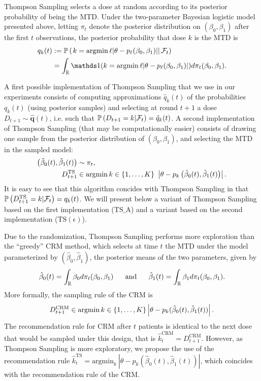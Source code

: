Thompson Sampling selects a dose at random according to its posterior probability of being the MTD. Under the two-parameter Bayesian logistic model presented above, letting $\pi_t$ denote the posterior distribution on $(\beta_0,\beta_1)$ after the first $t$ observations, the posterior probability that dose $k$ is the MTD is
\begin{align*}
{q}_k(t) &: = \bP\left(\left. k = \argmin{\ell} |\theta - p_\ell(\beta_0,\beta_1)| \right| \cF_t\right)
\\
&= \int_{\R} \ind{\left(k = \argmin{\ell} |\theta - p_\ell(\beta_0,\beta_1)|\right)} d\pi_t(\beta_0,\beta_1).
\end{align*}

A first possible implementation of Thompson Sampling that we use in our experiments consists of computing approximations $\hat{q}_k(t)$ of the probabilities ${q}_k(t)$ (using posterior samples) and selecting at round $t+1$ a dose $D_{t+1} \sim \hat{\bm q}(t)$, i.e. such that $\mathbb{P}\left(D_{t+1} = k | \mathcal{F}_t\right) = \hat{q}_k(t)$.
A second implementation of Thompson Sampling (that may be computationally easier) consists of drawing one sample from the posterior distribution of $(\beta_0,\beta_1)$, and selecting the MTD in the sampled model:  
\begin{align}
         \left(\tilde \beta_0(t), \tilde \beta_1(t)\right) & \sim \pi_t, \nonumber\\
          D_{t+1}^{\text{TS}} & \in \argmin{k \in \{1,\dots,K\}} \ \left|\theta - p_k\left(\tilde \beta_0(t),\tilde \beta_1(t)\right)\right|.\label{eq:SampleTS}
\end{align}
It is easy to see that this algorithm concides with Thompson Sampling in that $\mathbb{P}\left(D_{t+1}^{\text{TS}} = k | \mathcal{F}_t\right) = {q}_k(t)$. We will present below a variant of Thompson Sampling based on the first implementation (${\mathrm{TS}\_\mathrm{A}}$) and a variant based on the second implementation (${\mathrm{TS}(\epsilon)}$).

Due to the randomization, Thompson Sampling performs more exploration than the ``greedy'' CRM \citep{OQuigley90CRM} method, which selects at time $t$ the MTD under the model parameterized by $(\hat\beta_0,\hat\beta_1)$, the posterior means of the two parameters, given by
\begin{equation}\label{eq:CRMPostMean}
\hat{\beta}_0(t) = \int_\R \beta_0 d\pi_{t}(\beta_0,\beta_1) \ \ \ \ \ \text{and} \ \ \ \ \ \hat{\beta}_1(t) = \int_\R \beta_1 d\pi_{t}(\beta_0,\beta_1).
\end{equation}
More formally, the sampling rule of the CRM is
\begin{align*}
D_{t+1}^{\text{CRM}} \in \operatorname*{argmin}{k \in \{1,\dots,K\}} \left|\theta - p_k(\hat\beta_0(t),\hat\beta_1(t))\right|.
\end{align*}
The recommendation rule for CRM after $t$ patients is identical to the next dose that would be sampled under this design, that is $\hat{k}_t^{\text{CRM}} = D_{t+1}^{\text{CRM}}$. However, as Thompson Sampling is more exploratory, we propose the use of the recommendation rule $\hat{k}_t^{\text{TS}} = \text{argmin}_k \ |\theta - p_k(\hat\beta_0(t),\hat\beta_1(t))|$, which coincides with the recommendation rule of the CRM.

